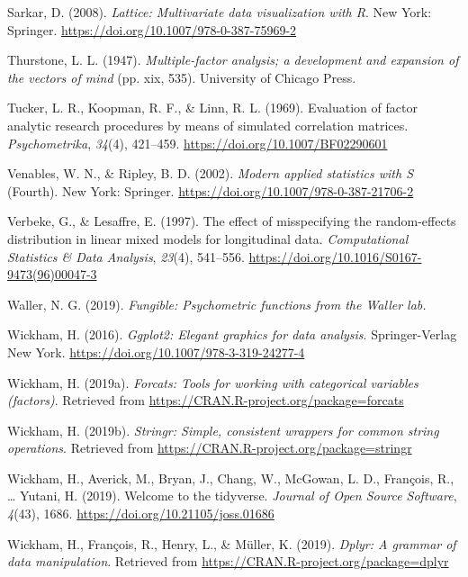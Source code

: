 \documentclass[
  english,
  man]{apa6}
\begin{document}
\leavevmode\hypertarget{ref-R-lattice}{}%
Sarkar, D. (2008). \emph{Lattice: Multivariate data visualization with R}. New York: Springer. \url{https://doi.org/10.1007/978-0-387-75969-2}

\leavevmode\hypertarget{ref-thurstone1947multiple}{}%
Thurstone, L. L. (1947). \emph{Multiple-factor analysis; a development and expansion of the vectors of mind} (pp. xix, 535). University of Chicago Press.

\leavevmode\hypertarget{ref-tucker1969}{}%
Tucker, L. R., Koopman, R. F., \& Linn, R. L. (1969). Evaluation of factor analytic research procedures by means of simulated correlation matrices. \emph{Psychometrika}, \emph{34}(4), 421--459. \url{https://doi.org/10.1007/BF02290601}

\leavevmode\hypertarget{ref-R-MASS}{}%
Venables, W. N., \& Ripley, B. D. (2002). \emph{Modern applied statistics with S} (Fourth). New York: Springer. \url{https://doi.org/10.1007/978-0-387-21706-2}

\leavevmode\hypertarget{ref-verbeke1997}{}%
Verbeke, G., \& Lesaffre, E. (1997). The effect of misspecifying the random-effects distribution in linear mixed models for longitudinal data. \emph{Computational Statistics \& Data Analysis}, \emph{23}(4), 541--556. \url{https://doi.org/10.1016/S0167-9473(96)00047-3}

\leavevmode\hypertarget{ref-R-fungible}{}%
Waller, N. G. (2019). \emph{Fungible: Psychometric functions from the Waller lab.}

\leavevmode\hypertarget{ref-R-ggplot2}{}%
Wickham, H. (2016). \emph{Ggplot2: Elegant graphics for data analysis}. Springer-Verlag New York. \url{https://doi.org/10.1007/978-3-319-24277-4}

\leavevmode\hypertarget{ref-R-forcats}{}%
Wickham, H. (2019a). \emph{Forcats: Tools for working with categorical variables (factors)}. Retrieved from \url{https://CRAN.R-project.org/package=forcats}

\leavevmode\hypertarget{ref-R-stringr}{}%
Wickham, H. (2019b). \emph{Stringr: Simple, consistent wrappers for common string operations}. Retrieved from \url{https://CRAN.R-project.org/package=stringr}

\leavevmode\hypertarget{ref-R-tidyverse}{}%
Wickham, H., Averick, M., Bryan, J., Chang, W., McGowan, L. D., François, R., \ldots{} Yutani, H. (2019). Welcome to the tidyverse. \emph{Journal of Open Source Software}, \emph{4}(43), 1686. \url{https://doi.org/10.21105/joss.01686}

\leavevmode\hypertarget{ref-R-dplyr}{}%
Wickham, H., François, R., Henry, L., \& Müller, K. (2019). \emph{Dplyr: A grammar of data manipulation}. Retrieved from \url{https://CRAN.R-project.org/package=dplyr}
\end{document}
